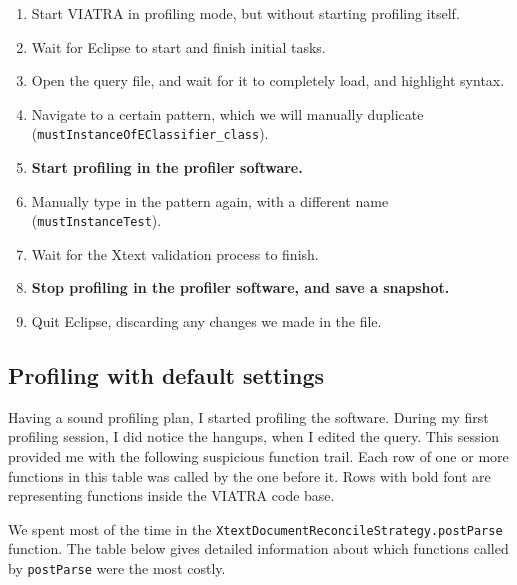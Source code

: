 \documentclass[11pt,a4paper,oneside]{report}
\begin{document}
\begin{enumerate}
    \item{Start VIATRA in profiling mode, but without starting profiling itself.}
    \item{Wait for Eclipse to start and finish initial tasks.}
    \item{Open the query file, and wait for it to completely load, and highlight syntax.}
    \item{
        Navigate to a certain pattern, which we will manually duplicate
        (\texttt{mustInstanceOfEClassifier\_class}).
    }
    \item{\textbf{Start profiling in the profiler software.}}
    \item{
        Manually type in the pattern again, with a different name
        (\texttt{mustInstanceTest}).
    }
    \item{Wait for the Xtext validation process to finish.}
    \item{\textbf{Stop profiling in the profiler software, and save a snapshot.}}
    \item{Quit Eclipse, discarding any changes we made in the file.}
\end{enumerate}

\subsection{Profiling with default settings}
Having a sound profiling plan, I started profiling the software. During my
first profiling session, I did notice the hangups, when I edited the query. This
session provided me with the following suspicious function trail. Each row of
one or more functions in this table was called by the one before it. Rows with
bold font are representing functions inside the VIATRA code base.

We spent most of the time in the
\texttt{XtextDocumentReconcileStrategy.postParse} function. The table below
gives detailed information about which functions called by \texttt{postParse}
were the most costly.
\end{document}
